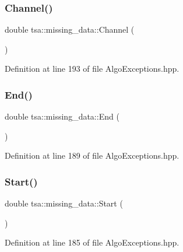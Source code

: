 \subsubsection{\texorpdfstring{Channel()}{Channel()}}
{\footnotesize\ttfamily double tsa\+::missing\+\_\+data\+::\+Channel (\begin{DoxyParamCaption}{ }\end{DoxyParamCaption})\hspace{0.3cm}{\ttfamily [inline]}}



Definition at line 193 of file Algo\+Exceptions.\+hpp.

\mbox{\label{classtsa_1_1missing__data_a10c01ad5fd1fd4bc26d69114cb90ee08}} 
\subsubsection{\texorpdfstring{End()}{End()}}
{\footnotesize\ttfamily double tsa\+::missing\+\_\+data\+::\+End (\begin{DoxyParamCaption}{ }\end{DoxyParamCaption})\hspace{0.3cm}{\ttfamily [inline]}}



Definition at line 189 of file Algo\+Exceptions.\+hpp.

\mbox{\label{classtsa_1_1missing__data_a14e20caa0f0f2baf341625d09e9da157}} 
\subsubsection{\texorpdfstring{Start()}{Start()}}
{\footnotesize\ttfamily double tsa\+::missing\+\_\+data\+::\+Start (\begin{DoxyParamCaption}{ }\end{DoxyParamCaption})\hspace{0.3cm}{\ttfamily [inline]}}



Definition at line 185 of file Algo\+Exceptions.\+hpp.



